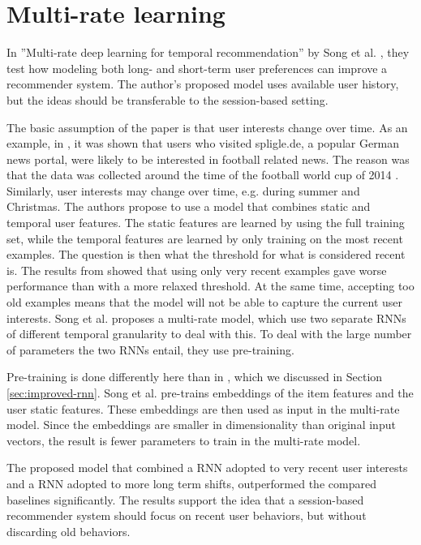 \section{Multi-rate learning}
In ''Multi-rate deep learning for temporal recommendation'' by Song et al. \cite{Song:2016:MDL:2911451.2914726}, they test how modeling both long- and short-term user preferences can improve a recommender system. The author's proposed model uses available user history, but the ideas should be transferable to the session-based setting.

The basic assumption of the paper is that user interests change over time. As an example, in \cite{Elkahky:2015:MDL:2736277.2741667}, it was shown that users who visited spligle.de, a popular German news portal, were likely to be interested in football related news. The reason was that the data was collected around the time of the football world cup of 2014 \cite{Song:2016:MDL:2911451.2914726}. Similarly, user interests may change over time, e.g. during summer and Christmas. The authors propose to use a model that combines static and temporal user features. The static features are learned by using the full training set, while the temporal features are learned by only training on the most recent examples. The question is then what the threshold for what is considered recent is. The results from \cite{DBLP:journals/corr/TanXL16} showed that using only very recent examples gave worse performance than with a more relaxed threshold. At the same time, accepting too old examples means that the model will not be able to capture the current user interests. Song et al. proposes a multi-rate model, which use two separate RNNs of different temporal granularity to deal with this. To deal with the large number of parameters the two RNNs entail, they use pre-training.

Pre-training is done differently here than in \cite{DBLP:journals/corr/TanXL16}, which we discussed in Section \ref{sec:improved-rnn}. Song et al. pre-trains embeddings of the item features and the user static features. These embeddings are then used as input in the multi-rate model. Since the embeddings are smaller in dimensionality than original input vectors, the result is fewer parameters to train in the multi-rate model.

The proposed model that combined a RNN adopted to very recent user interests and a RNN adopted to more long term shifts, outperformed the compared baselines significantly. The results support the idea that a session-based recommender system should focus on recent user behaviors, but without discarding old behaviors.


